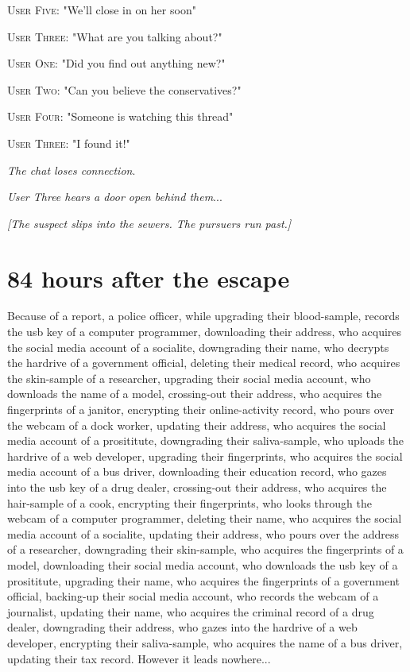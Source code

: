 \documentclass{report}
\begin{document}
\textsc{User Five}: "We'll close in on her soon" 

\textsc{User Three}: "What are you talking about?" 

\textsc{User One}: "Did you find out anything new?" 

\textsc{User Two}: "Can you believe the conservatives?" 

\textsc{User Four}: "Someone is watching this thread" 

\textsc{User Three}: "I found it!" 

\textit{The chat loses connection}. 

\textit{User Three hears a door open behind them}...

\textit{[The suspect slips into the sewers. The pursuers run past.]}


\section*{84 \small{hours after the escape}}

Because of a report, a police officer, while upgrading their blood-sample, records the usb key of a computer programmer, downloading their address, who acquires the social media account of a socialite, downgrading their name, who decrypts the hardrive of a government official, deleting their medical record, who acquires the skin-sample of a researcher, upgrading their social media account, who downloads the name of a model, crossing-out their address, who acquires the fingerprints of a janitor, encrypting their online-activity record, who pours over the webcam of a dock worker, updating their address, who acquires the social media account of a prosititute, downgrading their saliva-sample, who uploads the hardrive of a web developer, upgrading their fingerprints, who acquires the social media account of a bus driver, downloading their education record, who gazes into the usb key of a drug dealer, crossing-out their address, who acquires the hair-sample of a cook, encrypting their fingerprints, who looks through the webcam of a computer programmer, deleting their name, who acquires the social media account of a socialite, updating their address, who pours over the address of a researcher, downgrading their skin-sample, who acquires the fingerprints of a model, downloading their social media account, who downloads the usb key of a prosititute, upgrading their name, who acquires the fingerprints of a government official, backing-up their social media account, who records the webcam of a journalist, updating their name, who acquires the criminal record of a drug dealer, downgrading their address, who gazes into the hardrive of a web developer, encrypting their saliva-sample, who acquires the name of a bus driver, updating their tax record. However it leads nowhere...
\end{document}
